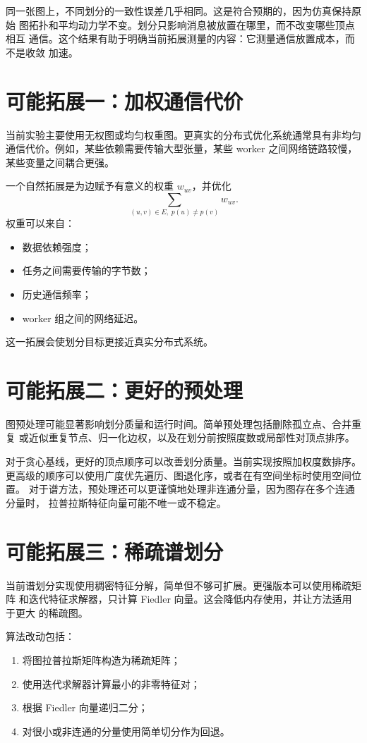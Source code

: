 \documentclass[UTF8, 11pt]{ctexart}
\begin{document}
同一张图上，不同划分的一致性误差几乎相同。这是符合预期的，因为仿真保持原始
图拓扑和平均动力学不变。划分只影响消息被放置在哪里，而不改变哪些顶点相互
通信。这个结果有助于明确当前拓展测量的内容：它测量通信放置成本，而不是收敛
加速。

\section{可能拓展一：加权通信代价}

当前实验主要使用无权图或均匀权重图。更真实的分布式优化系统通常具有非均匀
通信代价。例如，某些依赖需要传输大型张量，某些 worker 之间网络链路较慢，
某些变量之间耦合更强。

一个自然拓展是为边赋予有意义的权重 $w_{uv}$，并优化
\[
    \sum_{(u,v)\in E,\;p(u)\neq p(v)} w_{uv}.
\]
权重可以来自：
\begin{itemize}
    \item 数据依赖强度；
    \item 任务之间需要传输的字节数；
    \item 历史通信频率；
    \item worker 组之间的网络延迟。
\end{itemize}
这一拓展会使划分目标更接近真实分布式系统。

\section{可能拓展二：更好的预处理}

图预处理可能显著影响划分质量和运行时间。简单预处理包括删除孤立点、合并重复
或近似重复节点、归一化边权，以及在划分前按照度数或局部性对顶点排序。

对于贪心基线，更好的顶点顺序可以改善划分质量。当前实现按照加权度数排序。
更高级的顺序可以使用广度优先遍历、图退化序，或者在有空间坐标时使用空间位置。
对于谱方法，预处理还可以更谨慎地处理非连通分量，因为图存在多个连通分量时，
拉普拉斯特征向量可能不唯一或不稳定。

\section{可能拓展三：稀疏谱划分}

当前谱划分实现使用稠密特征分解，简单但不够可扩展。更强版本可以使用稀疏矩阵
和迭代特征求解器，只计算 Fiedler 向量。这会降低内存使用，并让方法适用于更大
的稀疏图。

算法改动包括：
\begin{enumerate}
    \item 将图拉普拉斯矩阵构造为稀疏矩阵；
    \item 使用迭代求解器计算最小的非零特征对；
    \item 根据 Fiedler 向量递归二分；
    \item 对很小或非连通的分量使用简单切分作为回退。
\end{enumerate}
\end{document}
